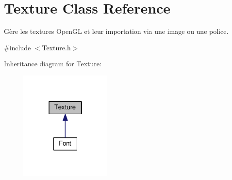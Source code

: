 \hypertarget{classTexture}{\section{Texture Class Reference}
\label{classTexture}
}


Gère les textures Open\+G\+L et leur importation via une image ou une police.  




{\ttfamily \#include $<$Texture.\+h$>$}



Inheritance diagram for Texture\+:\nopagebreak
\begin{figure}[H]
\begin{center}
\leavevmode
\includegraphics[width=130pt]{classTexture__inherit__graph}
\end{center}
\end{figure}
